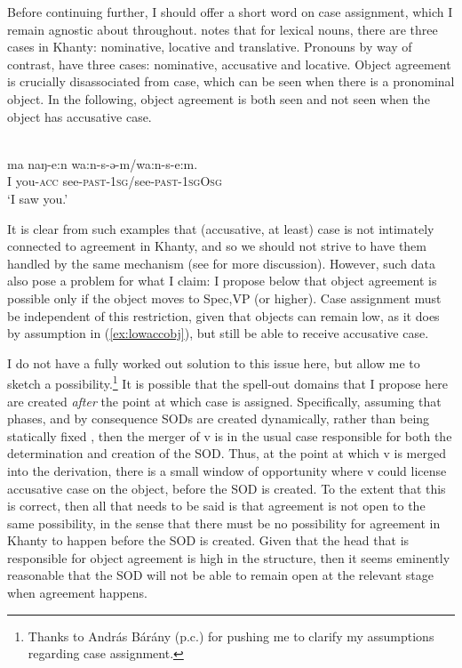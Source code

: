 \documentclass[output=paper
,modfonts
,nonflat]{langsci/langscibook}
\begin{document}
\noindent Before continuing further, I should offer a short word on case assignment, which I remain agnostic about throughout.
\citet{ostyakgrammar} notes that for lexical nouns, there are three cases in Khanty: nominative, locative and translative.
Pronouns by way of contrast, have three cases: nominative, accusative and locative.
Object agreement is crucially disassociated from case, which can be seen when there is a pronominal object.
In the following, object agreement is both seen and not seen when the object has accusative case.

\begin{exe}
  \ex \citet[][65]{ostyakgrammar}\\
    \gll ma naŋ-e:n wa:n-s-ə-m/wa:n-s-e:m.\\
    I you-\textsc{acc} see-\textsc{past-1sg}/see-\textsc{past-1sgOsg}\\
    \glt `I saw you.' \hfill  \label{ex:lowaccobj}
\end{exe}

\noindent It is clear from such examples that (accusative, at least) case is not intimately connected to agreement in Khanty, and so we should not strive to have them handled by the same mechanism (see \citealt[][ch. 5]{baker2008} for more discussion).
However, such data also pose a problem for what I claim: I propose below that object agreement is possible only if the object moves to Spec,VP (or higher).
Case assignment must be independent of this restriction, given that objects can remain low, as it does by assumption in (\ref{ex:lowaccobj}), but still be able to receive accusative case.

I do not have a fully worked out solution to this issue here, but allow me to sketch a possibility.\footnote{Thanks to András Bárány (p.c.) for pushing me to clarify my assumptions regarding case assignment.}
It is possible that the spell-out domains that I propose here are created \emph{after} the point at which case is assigned.
Specifically, assuming that phases, and by consequence SODs are created dynamically, rather than being statically fixed \citep[see for instance][]{bobaljikwurmbrand2005,bobaljikwurmbrand2013,boskovic2014}, then the merger of v is in the usual case responsible for both the determination and creation of the SOD.
Thus, at the point at which v is merged into the derivation, there is a small window of opportunity where v could license accusative case on the object, before the SOD is created.
To the extent that this is correct, then all that needs to be said is that agreement is not open to the same possibility, in the sense that there must be no possibility for agreement in Khanty to happen before the SOD is created.
Given that the head that is responsible for object agreement is high in the structure, then it seems eminently reasonable that the SOD will not be able to remain open at the relevant stage when agreement happens.
\end{document}
